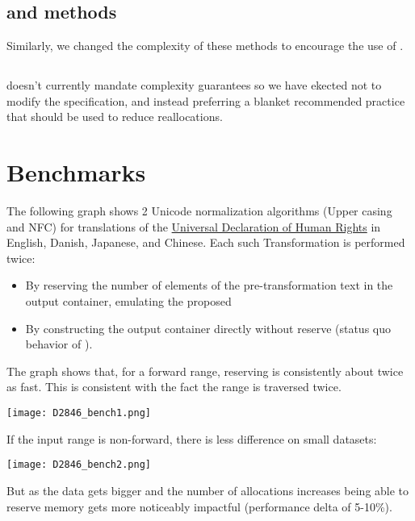 \documentclass{wg21}
\begin{document}
\subsection{  and  methods}

Similarly, we changed the complexity of these methods to encourage the use of .

\subsection{}

 doesn't currently mandate complexity guarantees so we have ekected not to modify the specification,
and instead preferring a blanket recommended practice that  should be used to reduce reallocations.

\section{Benchmarks}

The following graph shows 2 Unicode normalization algorithms (Upper casing and NFC) for translations of the \href{https://unicode.org/udhr/index.html}{Universal Declaration of Human Rights} in English, Danish, Japanese, and Chinese.
Each such Transformation is performed twice:

\begin{itemize}
\item By reserving the number of elements of the pre-transformation text in the output container, emulating the proposed 
\item By constructing the output container directly without reserve (status quo behavior of ).
\end{itemize}

The graph shows that, for a forward range, reserving is consistently about twice as fast. This is consistent with the fact the range is traversed twice.

\texttt{[image: D2846\_bench1.png]}

If the input range is non-forward, there is less difference on small datasets:

\texttt{[image: D2846\_bench2.png]}

But as the data gets bigger and the number of allocations increases being able to reserve memory gets more noticeably impactful (performance delta of 5-10\%).
\end{document}
